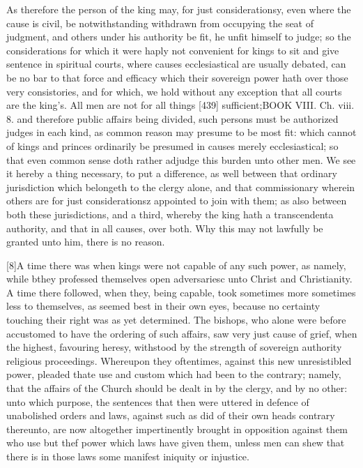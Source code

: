 As therefore the person of the king may, for just considerationsy, even where the cause is civil, be notwithstanding withdrawn from occupying the seat of judgment, and others under his authority be fit, he unfit himself to judge; so the considerations for which it were haply not convenient for kings to sit and give sentence in spiritual courts, where causes ecclesiastical are usually debated, can be no bar to that force and efficacy which their sovereign power hath over those very consistories, and for which, we hold without any exception that all courts are the king’s. All men are not for all things [439] sufficient;BOOK VIII. Ch. viii. 8. and therefore public affairs being divided, such persons must be authorized judges in each kind, as common reason may presume to be most fit: which cannot of kings and princes ordinarily be presumed in causes merely ecclesiastical; so that even common sense doth rather adjudge this burden unto other men. We see it hereby a thing necessary, to put a difference, as well between that ordinary jurisdiction which belongeth to the clergy alone, and that commissionary wherein others are for just considerationsz appointed to join with them; as also between both these jurisdictions, and a third, whereby the king hath a transcendenta authority, and that in all causes, over both. Why this may not lawfully be granted unto him, there is no reason.

[8]A time there was when kings were not capable of any such power, as namely, while bthey professed themselves open adversariesc unto Christ and Christianity. A time there followed, when they, being capable, took sometimes more sometimes less to themselves, as seemed best in their own eyes, because no certainty touching their right was as yet determined. The bishops, who alone were before accustomed to have the ordering of such affairs, saw very just cause of grief, when the highest, favouring heresy, withstood by the strength of sovereign authority religious proceedings. Whereupon they oftentimes, against this new unresistibled power, pleaded thate use and custom which had been to the contrary; namely, that the affairs of the Church should be dealt in by the clergy, and by no other: unto which purpose, the sentences that then were uttered in defence of unabolished orders and laws, against such as did of their own heads contrary thereunto, are now altogether impertinently brought in opposition against them who use but thef power which laws have given them, unless men can shew that there is in those laws some manifest iniquity or injustice.

